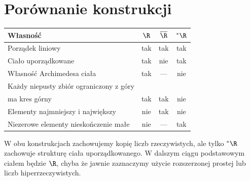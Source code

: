 \section{Porównanie konstrukcji}
\begin{center}
\begin{tabular}{lccc}
\hline
Własność & $\R$ & $\overline{\R}$ & $\mathord{}^*\R$\\
\hline
Porządek liniowy & tak & tak & tak\\
Ciało uporządkowane & tak & nie & tak\\
Własność Archimedesa ciała & tak & --- & nie\\
Każdy niepusty zbiór ograniczony z góry\\
\quad ma kres górny & tak & tak & nie\\
Elementy najmniejszy i największy & nie & tak & nie\\
Niezerowe elementy nieskończenie małe & nie & --- & tak\\
\hline
\end{tabular}
\end{center}
W obu konstrukcjach zachowujemy kopię liczb rzeczywistych, ale tylko $\mathord{}^*\R$ zachowuje strukturę ciała uporządkowanego. W dalszym ciągu podstawowym ciałem będzie $\R$, chyba że jawnie zaznaczymy użycie rozszerzonej prostej lub liczb hiperrzeczywistych.
